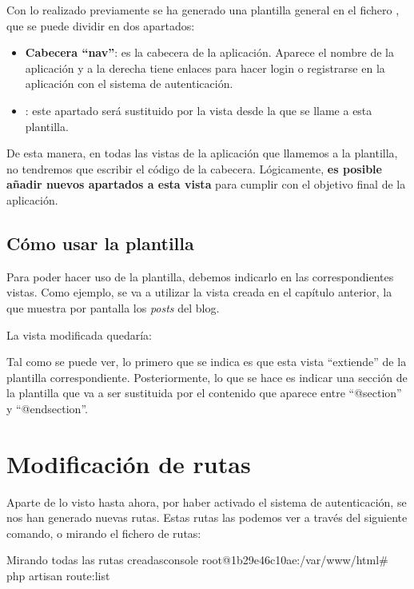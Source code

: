 Con lo realizado previamente se ha generado una plantilla general en el fichero , que se puede dividir en dos apartados:

\begin{itemize}
    \item \textbf{Cabecera “nav”}: es la cabecera de la aplicación. Aparece el nombre de la aplicación y a la derecha tiene enlaces para hacer login o registrarse en la aplicación con el sistema de autenticación.

    \item {}: este apartado será sustituido por la vista desde la que se llame a esta plantilla.
\end{itemize}

De esta manera, en todas las vistas de la aplicación que llamemos a la plantilla, no tendremos que escribir el código de la cabecera. Lógicamente, \textbf{es posible añadir nuevos apartados a esta vista} para cumplir con el objetivo final de la aplicación.

\section{Cómo usar la plantilla}

Para poder hacer uso de la plantilla, debemos indicarlo en las correspondientes vistas. Como ejemplo, se va a utilizar la vista creada en el capítulo anterior, la que muestra por pantalla los \textit{posts} del blog.

La vista modificada quedaría:


Tal como se puede ver, lo primero que se indica es que esta vista “extiende” de la plantilla correspondiente. Posteriormente, lo que se hace es indicar una sección de la plantilla que va a ser sustituida por el contenido que aparece entre “@section” y “@endsection”.


\chapter{Modificación de rutas}
Aparte de lo visto hasta ahora, por haber activado el sistema de autenticación, se nos han generado nuevas rutas. Estas rutas las podemos ver a través del siguiente comando, o mirando el fichero de rutas:

\begin{mycode}{Mirando todas las rutas creadas}{console}{}
root@1b29e46c10ae:/var/www/html# php artisan route:list
\end{mycode}
